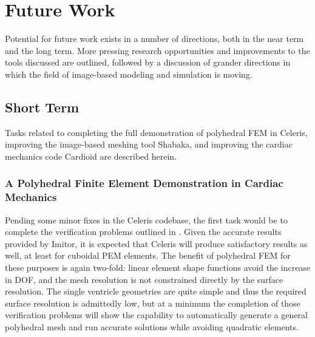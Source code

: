 \chapter{Future Work}
\label{chap:6}

Potential for future work exists in a number of directions, both in the near term and the long term. More pressing research opportunities and improvements to the tools discussed are outlined, followed by a discussion of grander directions in which the field of image-based modeling and simulation is moving.

\section{Short Term}
\label{Short Term}

Tasks related to completing the full demonstration of polyhedral FEM in Celeris, improving the image-based meshing tool Shabaka, and improving the cardiac mechanics code Cardioid are described herein.

\subsection[A Polyhedral Finite Element Demonstration in Cardiac \\ Mechanics]{\texorpdfstring{A Polyhedral Finite Element Demonstration in Cardiac Mechanics}{A Polyhedral Finite Element Demonstration in Cardiac Mechanics}}
\label{A Polyhedral Finite Element Demonstration in Cardiac Mechanics}

Pending some minor fixes in the Celeris codebase, the first task would be to complete the verification problems outlined in . Given the accurate results provided by Imitor, it is expected that Celeris will produce satisfactory results as well, at least for cuboidal PEM elements. The benefit of polyhedral FEM for these purposes is again two-fold: linear element shape functions avoid the increase in DOF, and the mesh resolution is not constrained directly by the surface resolution. The single ventricle geometries are quite simple and thus the required surface resolution is admittedly low, but at a minimum the completion of those verification problems will show the capability to automatically generate a general polyhedral mesh and run accurate solutions while avoiding quadratic elements.

